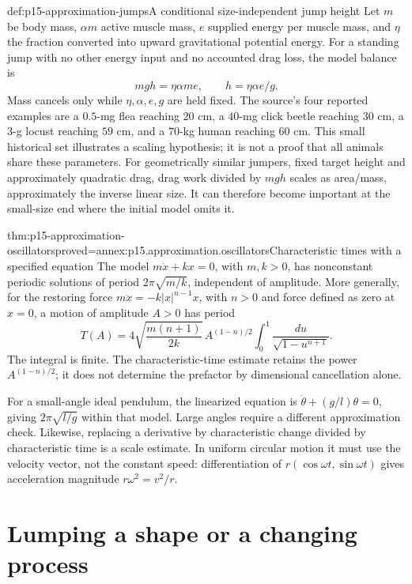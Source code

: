 \begin{hbexample}{def:p15-approximation-jumps}{A conditional size-independent jump height}
Let \(m\) be body mass, \(\alpha m\) active muscle mass, \(e\) supplied
energy per muscle mass, and \(\eta\) the fraction converted into upward
gravitational potential energy. For a standing jump with no other energy
input and no accounted drag loss, the model balance is
\[
 mgh=\eta\alpha m e,\qquad h=\eta\alpha e/g.
\]
Mass cancels only while \(\eta,\alpha,e,g\) are held fixed. The source's
four reported examples are a \(0.5\)-mg flea reaching \(20\) cm, a
\(40\)-mg click beetle reaching \(30\) cm, a \(3\)-g locust reaching
\(59\) cm, and a \(70\)-kg human reaching \(60\) cm. This small historical set illustrates
a scaling hypothesis; it is not a proof that all animals share these parameters.
For geometrically similar jumpers, fixed target height and approximately
quadratic drag, drag work divided by \(mgh\) scales as area/mass,
approximately the inverse linear size. It can therefore become important
at the small-size end where the initial model omits it.
\end{hbexample}

\begin{hbtheorem}{thm:p15-approximation-oscillators}{proved=annex:p15.approximation.oscillators}{Characteristic times with a specified equation}
The model \(m\ddot x+kx=0\), with \(m,k>0\), has nonconstant periodic
solutions of period \(2\pi\sqrt{m/k}\), independent of amplitude.
More generally, for the restoring force
\(m\ddot x=-k|x|^{n-1}x\), with \(n>0\) and force defined as zero at
\(x=0\), a motion of amplitude \(A>0\)
has period
\[
 T(A)=4\sqrt{\frac{m(n+1)}{2k}}\,
 A^{(1-n)/2}\int_0^1\frac{du}{\sqrt{1-u^{n+1}}}.
\]
The integral is finite. The characteristic-time estimate retains the power
\(A^{(1-n)/2}\); it does not determine the prefactor by dimensional
cancellation alone.
\end{hbtheorem}

For a small-angle ideal pendulum, the linearized equation is
\(\ddot\theta+(g/l)\theta=0\), giving \(2\pi\sqrt{l/g}\) within that
model. Large angles require a different approximation check. Likewise,
replacing a derivative by characteristic change divided by characteristic
time is a scale estimate. In uniform circular motion it must use the
velocity vector, not the constant speed: differentiation of
\(r(\cos\omega t,\sin\omega t)\) gives acceleration magnitude
\(r\omega^2=v^2/r\).

\section{Lumping a shape or a changing process}

